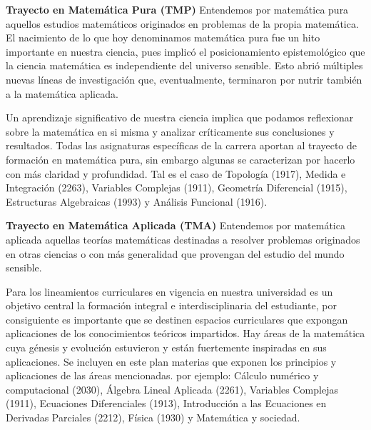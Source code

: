 \documentclass[a4paper, 12pt]{article}
\begin{document}
\begin{description}


\item{\textbf{Trayecto en Matemática Pura (TMP)}} Entendemos por matemática pura aquellos estudios  matemáticos originados en problemas de la propia matemática. El nacimiento de lo que hoy denominamos  matemática pura fue un hito importante en  nuestra ciencia, pues implicó el posicionamiento epistemológico que la ciencia matemática es independiente del universo sensible. Esto abrió múltiples nuevas líneas de investigación que, eventualmente, terminaron por nutrir también a la matemática aplicada. 

Un aprendizaje significativo de nuestra ciencia implica que podamos reflexionar sobre la matemática en si  misma y analizar críticamente sus conclusiones y resultados. Todas las asignaturas específicas  de la carrera aportan al trayecto de formación en matemática pura, sin embargo algunas se caracterizan por hacerlo con más claridad y profundidad. Tal es el caso de Topología (1917), Medida e Integración (2263), Variables Complejas (1911), Geometría Diferencial (1915), Estructuras Algebraicas (1993) y Análisis Funcional (1916). 

 
\item{\textbf{Trayecto en Matemática Aplicada (TMA)}} Entendemos por matemática aplicada aquellas teorías matemáticas destinadas a resolver problemas originados en  otras ciencias o con más generalidad  que provengan del estudio  del  mundo sensible. 

Para los lineamientos curriculares en vigencia en nuestra universidad es un objetivo central  la formación integral e interdisciplinaria del estudiante, por consiguiente es importante que se destinen   espacios curriculares que  expongan aplicaciones de los conocimientos teóricos impartidos. Hay áreas de la matemática cuya génesis  y evolución estuvieron y están fuertemente inspiradas  en sus aplicaciones. Se incluyen en este plan materias que exponen los principios y aplicaciones de las áreas mencionadas. por ejemplo: Cálculo numérico y computacional (2030), Álgebra Lineal Aplicada (2261), Variables Complejas (1911), Ecuaciones Diferenciales (1913), Introducción a las Ecuaciones en Derivadas Parciales (2212), Física (1930) y Matemática y sociedad.





\end{description}
\end{document}
